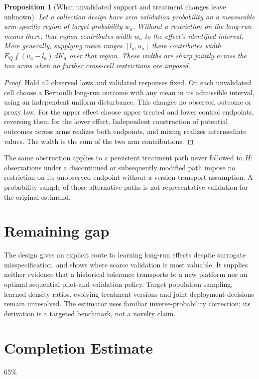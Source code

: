 \documentclass[11pt]{article}
\newtheorem{proposition}[theorem]{Proposition}
\theoremstyle{remark}
\begin{document}
\begin{proposition}[What unvalidated support and treatment changes leave unknown]
Let a collection design have zero validation probability on a measurable arm-specific region of target probability $w_a$. Without a restriction on the long-run means there, that region contributes width $w_a$ to the effect's identified interval. More generally, supplying mean ranges $[l_a,u_a]$ there contributes width
$E_Q\int(u_a-l_a)\,dK_a$ over that region. These widths are sharp jointly across the two arms when no further cross-cell restrictions are imposed.
\end{proposition}
\begin{proof}
Hold all observed laws and validated responses fixed. On each unvalidated cell choose a Bernoulli long-run outcome with any mean in its admissible interval, using an independent uniform disturbance. This changes no observed outcome or proxy law. For the upper effect choose upper treated and lower control endpoints, reversing them for the lower effect. Independent construction of potential outcomes across arms realizes both endpoints, and mixing realizes intermediate values. The width is the sum of the two arm contributions.
\end{proof}
The same obstruction applies to a persistent treatment path never followed to $H$: observations under a discontinued or subsequently modified path impose no restriction on its unobserved endpoint without a version-transport assumption. A probability sample of those alternative paths is not representative validation for the original estimand.

\section*{Remaining gap}
The design gives an explicit route to learning long-run effects despite surrogate misspecification, and shows where scarce validation is most valuable. It supplies neither evidence that a historical tolerance transports to a new platform nor an optimal sequential pilot-and-validation policy. Target population sampling, learned density ratios, evolving treatment versions and joint deployment decisions remain unresolved. The estimator uses familiar inverse-probability correction; its derivation is a targeted benchmark, not a novelty claim.

\section{Completion Estimate}
65\%
\end{document}
